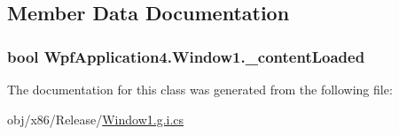 \subsection{Member Data Documentation}
\hypertarget{classWpfApplication4_1_1Window1_aaba1ddab2801ca465abb0092ccc6c6bf}{
\subsubsection[{\-\_\-content\-Loaded}]{\setlength{\rightskip}{0pt plus 5cm}bool Wpf\-Application4.\-Window1.\-\_\-content\-Loaded\hspace{0.3cm}{\ttfamily [private]}}}\label{classWpfApplication4_1_1Window1_aaba1ddab2801ca465abb0092ccc6c6bf}


The documentation for this class was generated from the following file\-:\begin{DoxyCompactItemize}
\item 
obj/x86/\-Release/\hyperlink{Window1_8g_8i_8cs}{Window1.\-g.\-i.\-cs}\end{DoxyCompactItemize}
